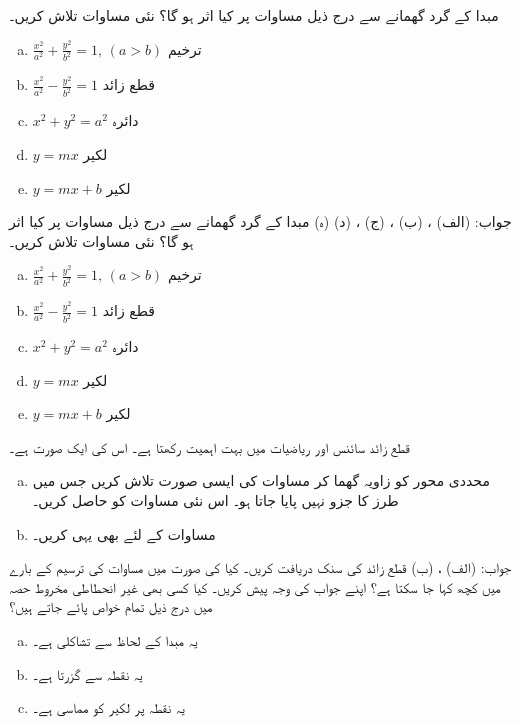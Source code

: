 مبدا کے گرد  گھمانے سے درج ذیل مساوات پر کیا اثر ہو گا؟ نئی مساوات تلاش کریں۔
\begin{enumerate}[a.]
\item
$\tfrac{x^2}{a^2}+\tfrac{y^2}{b^2}=1,\, (a>b)$\quad
ترخیم
\item
$\tfrac{x^2}{a^2}-\tfrac{y^2}{b^2}=1$\quad
قطع زائد
\item
$x^2+y^2=a^2$\quad 
دائرہ
\item
$y=mx$\quad
لکیر
\item
$y=mx+b$\quad
لکیر
\end{enumerate} 
جواب:\quad
(الف) ، (ب) ، (ج) ، (د)  (ہ) 
مبدا کے گرد  گھمانے سے درج ذیل مساوات پر کیا اثر ہو گا؟ نئی مساوات تلاش کریں۔
\begin{enumerate}[a.]
\item
$\tfrac{x^2}{a^2}+\tfrac{y^2}{b^2}=1,\, (a>b)$\quad
ترخیم
\item
$\tfrac{x^2}{a^2}-\tfrac{y^2}{b^2}=1$\quad
قطع زائد
\item
$x^2+y^2=a^2$\quad
دائرہ
\item
$y=mx$\quad
لکیر
\item
$y=mx+b$\quad
لکیر
\end{enumerate}
قطع زائد   سائنس اور ریاضیات میں بہت اہمیت رکھتا ہے۔ اس  کی ایک صورت  ہے۔ 
\begin{enumerate}[a.]
\item
محددی محور کو زاویہ گھما کر  مساوات  کی  ایسی صورت تلاش کریں جس میں  طرز کا جزو نہیں پایا جاتا ہو۔ اس نئی مساوات کو حاصل کریں۔
\item
مساوات  کے لئے بھی یہی کریں۔
\end{enumerate}
جواب:\quad
(الف) ، (ب) 
قطع زائد  کی سنک دریافت کریں۔
کیا  کی صورت میں مساوات  کی ترسیم کے بارے میں کچھ کہا جا سکتا ہے؟ اپنے جواب کی وجہ پیش کریں۔
کیا کسی بھی غیر انحطاطی مخروط حصہ   میں درج ذیل تمام خواص پائے جاتے ہیں؟
\begin{enumerate}[a.]
\item
یہ مبدا کے لحاظ سے تشاکلی ہے۔
\item
یہ نقطہ  سے گزرتا ہے۔
\item
یہ نقطہ  پر لکیر  کو مماسی ہے۔
\end{enumerate} 
